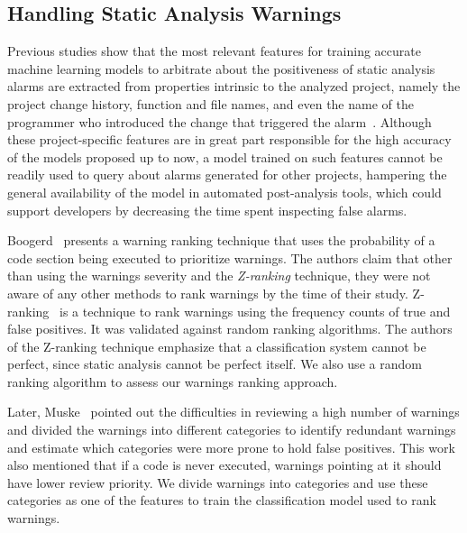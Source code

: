 
\subsection{Handling Static Analysis Warnings}
\label{sub:related_work}

Previous studies show that the most relevant features for training accurate
machine learning models to arbitrate about the positiveness of static analysis
alarms are extracted from properties intrinsic to the analyzed project,
namely the project change history, function and file names, and even the name
of the programmer who introduced the change that triggered the
alarm~\cite{kremenek2004correlation, heckman2009model, jung2005taming,
ruthruff_predicting_2008, yoon2014reducing}. Although these project-specific
features are in great part responsible for the high accuracy of the models
proposed up to now, a model trained on such features cannot be readily used to
query about alarms generated for other projects, hampering the general
availability of the model in automated post-analysis tools, which could
support developers by decreasing the time spent inspecting false alarms.

Boogerd~\cite{boogerd2006prioritizing} presents a warning ranking technique
that uses the probability of a code section being executed to prioritize
warnings. The authors claim that other than using the warnings severity and the
\textit{Z-ranking} technique, they were not aware of any other methods to rank
warnings by the time of their study. Z-ranking~\cite{kremenek2003z} is a
technique to rank warnings using the frequency counts of true and false
positives. It was validated against random ranking algorithms. The
authors of the Z-ranking technique emphasize that a classification system
cannot be perfect, since static analysis cannot be perfect itself.
We also use a random ranking algorithm to assess our warnings ranking approach.

Later, Muske~\cite{muske2013review} pointed out the difficulties in reviewing a high
number of warnings and divided the warnings into different categories to identify
redundant warnings and estimate which categories were more prone to hold false
positives. This work also mentioned that if a code is never executed,
warnings pointing at it should have lower review priority.
We divide warnings into categories and use these categories as one of the features
to train the classification model used to rank warnings.

